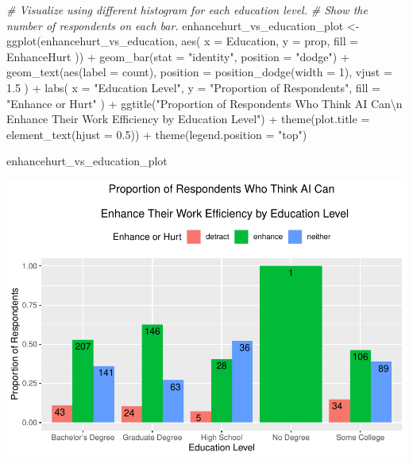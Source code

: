 \documentclass[
]{article}
\newenvironment{Shaded}{\begin{snugshade}}{\end{snugshade}}
\newcommand{\AttributeTok}[1]{\textcolor[rgb]{0.77,0.63,0.00}{#1}}
\newcommand{\CommentTok}[1]{\textcolor[rgb]{0.56,0.35,0.01}{\textit{#1}}}
\newcommand{\DecValTok}[1]{\textcolor[rgb]{0.00,0.00,0.81}{#1}}
\newcommand{\FloatTok}[1]{\textcolor[rgb]{0.00,0.00,0.81}{#1}}
\newcommand{\FunctionTok}[1]{\textcolor[rgb]{0.00,0.00,0.00}{#1}}
\newcommand{\NormalTok}[1]{#1}
\newcommand{\OtherTok}[1]{\textcolor[rgb]{0.56,0.35,0.01}{#1}}
\newcommand{\SpecialCharTok}[1]{\textcolor[rgb]{0.00,0.00,0.00}{#1}}
\newcommand{\StringTok}[1]{\textcolor[rgb]{0.31,0.60,0.02}{#1}}
\begin{document}
\begin{Shaded}
\begin{Highlighting}[]
\CommentTok{\# Visualize using different histogram for each education level.}
\CommentTok{\# Show the number of respondents on each bar.}
\NormalTok{enhancehurt\_vs\_education\_plot }\OtherTok{\textless{}{-}} \FunctionTok{ggplot}\NormalTok{(enhancehurt\_vs\_education, }\FunctionTok{aes}\NormalTok{(}
  \AttributeTok{x =}\NormalTok{ Education, }\AttributeTok{y =}\NormalTok{ prop,}
  \AttributeTok{fill =}\NormalTok{ EnhanceHurt}
\NormalTok{)) }\SpecialCharTok{+}
  \FunctionTok{geom\_bar}\NormalTok{(}\AttributeTok{stat =} \StringTok{"identity"}\NormalTok{, }\AttributeTok{position =} \StringTok{"dodge"}\NormalTok{) }\SpecialCharTok{+}
  \FunctionTok{geom\_text}\NormalTok{(}\FunctionTok{aes}\NormalTok{(}\AttributeTok{label =}\NormalTok{ count),}
    \AttributeTok{position =} \FunctionTok{position\_dodge}\NormalTok{(}\AttributeTok{width =} \DecValTok{1}\NormalTok{),}
    \AttributeTok{vjust =} \FloatTok{1.5}
\NormalTok{  ) }\SpecialCharTok{+}
  \FunctionTok{labs}\NormalTok{(}
    \AttributeTok{x =} \StringTok{"Education Level"}\NormalTok{, }\AttributeTok{y =} \StringTok{"Proportion of Respondents"}\NormalTok{,}
    \AttributeTok{fill =} \StringTok{"Enhance or Hurt"}
\NormalTok{  ) }\SpecialCharTok{+}
  \FunctionTok{ggtitle}\NormalTok{(}\StringTok{"Proportion of Respondents Who Think AI Can}\SpecialCharTok{\textbackslash{}n}
\StringTok{  Enhance Their Work Efficiency by Education Level"}\NormalTok{) }\SpecialCharTok{+}
  \FunctionTok{theme}\NormalTok{(}\AttributeTok{plot.title =} \FunctionTok{element\_text}\NormalTok{(}\AttributeTok{hjust =} \FloatTok{0.5}\NormalTok{)) }\SpecialCharTok{+}
  \FunctionTok{theme}\NormalTok{(}\AttributeTok{legend.position =} \StringTok{"top"}\NormalTok{)}

\NormalTok{enhancehurt\_vs\_education\_plot}
\end{Highlighting}
\end{Shaded}

\includegraphics{analysis_files/figure-latex/enhancehurt-vs-education-1.pdf}
\end{document}
